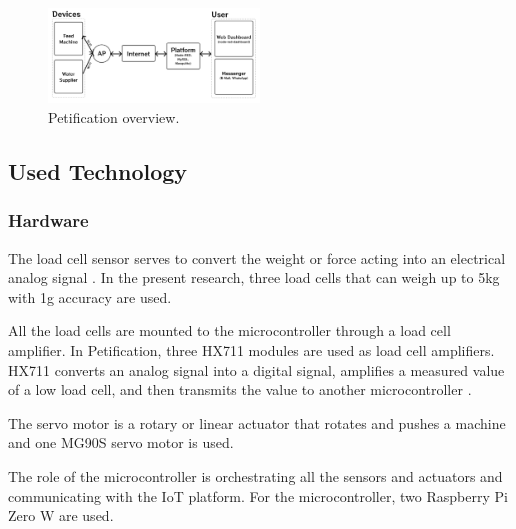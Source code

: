 \documentclass[conference]{IEEEtran}
\begin{document}
\begin{figure}[htbp]
\centerline{\includegraphics[width=0.5\textwidth]{./images/Overview.png}}
\caption{Petification overview.}
\label{fig}
\end{figure}

\subsection{Used Technology}
\subsubsection{Hardware}
The load cell sensor serves to convert the weight or force acting into an electrical analog signal \cite{b15}. In the present research, three load cells that can weigh up to 5kg with 1g accuracy are used.

All the load cells are mounted to the microcontroller through a load cell amplifier. In Petification, three HX711 modules are used as load cell amplifiers. HX711 converts an analog signal into a digital signal, amplifies a measured value of a low load cell, and then transmits the value to another microcontroller \cite{b16}. 

The servo motor is a rotary or linear actuator that rotates and pushes a machine \cite{b17} and one MG90S servo motor is used.

The role of the microcontroller is orchestrating all the sensors and actuators and communicating with the IoT platform. For the microcontroller, two Raspberry Pi Zero W are used.
\end{document}
